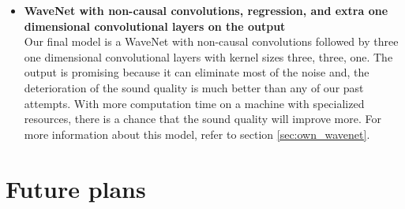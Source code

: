 \documentclass{article}
\begin{document}
\begin{itemize}
	\item \textbf{WaveNet with non-causal convolutions, regression, and extra one dimensional convolutional layers on the output} \\
	Our final model is a WaveNet with non-causal convolutions followed by three one dimensional convolutional layers with kernel sizes three, three, one. The output is promising because it can eliminate most of the noise and, the deterioration of the sound quality is much better than any of our past attempts. With more computation time on a machine with specialized resources, there is a chance that the sound quality will improve more. For more information about this model, refer to section \ref{sec:own_wavenet}.
	
	\end{itemize}



	
	
	\section{Future plans}
	\label{sec:experiments}
	
	\newpage
	\printbibliography
\end{document}
